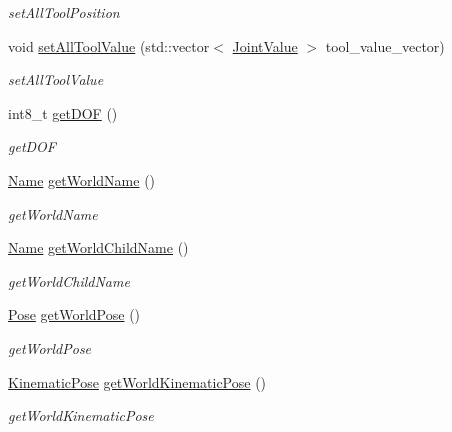 \begin{DoxyCompactItemize}
\begin{DoxyCompactList}\small\item\em set\+All\+Tool\+Position \end{DoxyCompactList}\item 
void \hyperlink{classrobotis__manipulator_1_1_manipulator_aea664539cecc8a68c7d58ccbf9760787}{set\+All\+Tool\+Value} (std\+::vector$<$ \hyperlink{namespacerobotis__manipulator_aa0556c98c5294ccf3a96c2d0fe315e40}{Joint\+Value} $>$ tool\+\_\+value\+\_\+vector)
\begin{DoxyCompactList}\small\item\em set\+All\+Tool\+Value \end{DoxyCompactList}\item 
int8\+\_\+t \hyperlink{classrobotis__manipulator_1_1_manipulator_a2be640cd5d1fb496f5a6ccd2bb29d781}{get\+D\+OF} ()
\begin{DoxyCompactList}\small\item\em get\+D\+OF \end{DoxyCompactList}\item 
\hyperlink{namespacerobotis__manipulator_a08c2d25e77a01ad75b9bb740f8ce4765}{Name} \hyperlink{classrobotis__manipulator_1_1_manipulator_a3b070bf112ee69b8982eaae8deb30572}{get\+World\+Name} ()
\begin{DoxyCompactList}\small\item\em get\+World\+Name \end{DoxyCompactList}\item 
\hyperlink{namespacerobotis__manipulator_a08c2d25e77a01ad75b9bb740f8ce4765}{Name} \hyperlink{classrobotis__manipulator_1_1_manipulator_a628177e105b1321f4e52a2ae8dffa9a2}{get\+World\+Child\+Name} ()
\begin{DoxyCompactList}\small\item\em get\+World\+Child\+Name \end{DoxyCompactList}\item 
\hyperlink{structrobotis__manipulator_1_1_pose}{Pose} \hyperlink{classrobotis__manipulator_1_1_manipulator_a479f098004c0c5159d43167f77f3e042}{get\+World\+Pose} ()
\begin{DoxyCompactList}\small\item\em get\+World\+Pose \end{DoxyCompactList}\item 
\hyperlink{structrobotis__manipulator_1_1_kinematic_pose}{Kinematic\+Pose} \hyperlink{classrobotis__manipulator_1_1_manipulator_a0f6de4e9c426d25e6f8dd796a7fa7e67}{get\+World\+Kinematic\+Pose} ()
\begin{DoxyCompactList}\small\item\em get\+World\+Kinematic\+Pose \end{DoxyCompactList}\item 

\end{DoxyCompactItemize}
